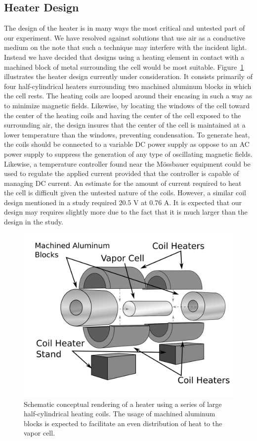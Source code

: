 \documentclass[aps,twocolumn,secnumarabic,balancelastpage,amsmath,amssymb,nofootinbib]{revtex4}
\begin{document}
\subsection*{Heater Design}

The design of the heater is in many ways the most critical and untested part of our experiment. We have resolved against solutions that use air as a conductive medium on the note that such a technique may interfere with the incident light. Instead we have decided that designs using a heating element in contact with a machined block of metal surrounding the cell would be most suitable. Figure~\ref{fig:heater} illustrates the heater design currently under consideration. It consists primarily of four half-cylindrical heaters surrounding two machined aluminum blocks in which the cell rests. The heating coils are looped around their encasing in such a way as to minimize magnetic fields. Likewise, by locating the windows of the cell toward the center of the heating coils and having the center of the cell exposed to the surrounding air, the design insures that the center of the cell is maintained at a lower temperature than the windows, preventing condensation. To generate heat, the coils should be connected to a variable DC power supply as oppose to an AC power supply to suppress the generation of any type of oscillating magnetic fields. Likewise, a temperature controller found near the M\"ossbauer equipment could be used to regulate the applied current provided that the controller is capable of managing DC current. An estimate for the amount of current required to heat the cell is difficult given the untested nature of the coils. However, a similar coil design mentioned in a study required 20.5 V at 0.76 A\cite{sclark04}. It is expected that our design may requires slightly more due to the fact that it is much larger than the design in the study. 

\begin{figure}[h!]
\includegraphics[width=0.8\linewidth]{heater.png}
\caption{\label{fig:heater} Schematic conceptual rendering of a heater using a series of large half-cylindrical heating coils. The usage of machined aluminum blocks is expected to facilitate an even distribution of heat to the vapor cell. }
\end{figure}
\end{document}

